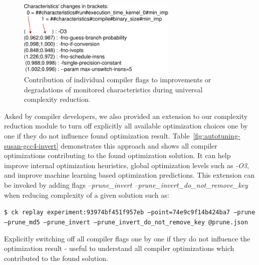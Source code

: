    \begin{figure}[]
     \centering
      \includegraphics[width=3.0in]
      {ck-assets/a472d964631c80a2-cropped.pdf} %
     \caption{
       Contribution of individual compiler flags to improvements or degradations of monitored characteristics during universal complexity reduction.
     }
     \label{fig:ck-pruning-contribution}
   \end{figure}

Asked by compiler developers, we also provided an extension to our complexity reduction module 
to turn off explicitly all available optimization choices one by one
if they do not influence found optimization result.
%
Table~\ref{fig:autotuning-susan-gcc4-invert} demonstrates this approach and shows all compiler optimizations contributing to the found optimization solution.
%
It can help improve internal optimization heuristics, global optimization levels such as \textit{-O3},
and improve machine learning based optimization predictions.
%
This extension can be invoked by adding flags \textit{--prune\_invert --prune\_invert\_do\_not\_remove\_key}
when reducing complexity of a given solution such as:
\begin{flushleft}
\texttt{\$ ck replay experiment:93974bf451f957eb --point=74e9c9f14b424ba7 --prune --prune\_md5 --prune\_invert --prune\_invert\_do\_not\_remove\_key @prune.json}
\end{flushleft}

  \begin{table}[]
   \centering
   \caption{
     Explicitly switching off all compiler flags one by one if they do not influence the optimization result - 
     useful to understand all compiler optimizations which contributed to the found solution. 
   }
   \label{fig:autotuning-susan-gcc4-invert}
  \end{table}

